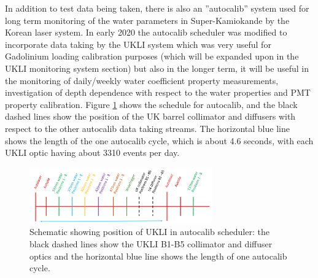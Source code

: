 \begin{figure}[!htbp]
    
\end{figure}

In addition to test data being taken, there is also an ''autocalib'' system used for long term monitoring of the water parameters in Super-Kamiokande by the Korean laser system. In early 2020 the autocalib scheduler was modified to incorporate data taking by the UKLI system which was very useful for Gadolinium loading calibration purposes (which will be expanded upon in the UKLI monitoring system section) but also in the longer term, it will be useful in the monitoring of daily/weekly water coefficient property measurements, investigation of depth dependence with respect to the water properties and PMT property calibration. Figure \ref{fig:autocalib} shows the schedule for autocalib, and the black dashed lines show the position of the UK barrel collimator and diffusers with respect to the other autocalib data taking streams. The horizontal blue line shows the length of the one autocalib cycle, which is about 4.6 seconds, with each UKLI optic having about 3310 events per day.

\begin{figure}
    \centering
    \includegraphics[width=0.7\textwidth]{Figures/autocalib.png}
    \caption{Schematic showing position of UKLI in autocalib scheduler: the black dashed lines show the UKLI B1-B5 collimator and diffuser optics and the horizontal blue line shows the length of one autocalib cycle.}
    \label{fig:autocalib}
\end{figure}

